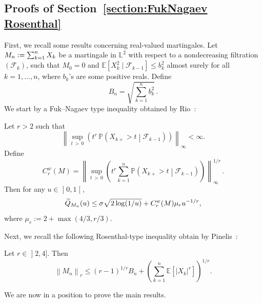 \documentclass[AHL,Unicode,longabstracts,published]{cedram}
\newcommand{\bE}{\mathbb{E}}
\newcommand{\bL}{\mathbb{L}}
\newcommand{\bP}{\mathbb{P}}
\newcommand{\cF}{\mathcal{F}}
\newcommand{\intervalleoo}[2]{\mathopen{]} #1\mathclose{}\mathpunct{},#2\mathclose{[}}
\newcommand{\intervalleof}[2]{\mathopen{]} #1\mathclose{}\mathpunct{},#2\mathclose{]}}
\let\oldtilde\tilde
\renewcommand*{\tilde}[1]{\mathchoice{\widetilde{#1}}{\widetilde{#1}}{\oldtilde{#1}}{\oldtilde{#1}}}
\begin{document}
\subsection{Proofs of Section~\ref{section:FukNagaev Rosenthal}}

First, we recall some results concerning real-valued martingales. Let $M_n:=\sum_{k=1}^n \linebreak X_k$ be a martingale in $\bL^2$ with respect to a nondecreasing filtration $(\cF_k)$, such that $M_0=0$ and $\bE[X_k^2\mid\cF_{k-1}]\leq b_k^2$ almost surely for all $k=1,\ldots,n$, where $b_k$'s are some positive reals. Define
\[
B_n=\sqrt{\sum_{k=1}^n b_k^2}\,.
\]
We start by a Fuk--Nagaev type inequality obtained by Rio~\cite{Rio17a}:
\begin{theo}\label{thm:Fuk-Nagaev Rio}
Let $r>2$ such that
\[
\left\|\sup_{t\,>\,0}\left(t^r\,\bP(X_{k+}>t\middle|\cF_{k-1})\right)\right\|_\infty<\infty.
\]
Define
\[
C_r^w(M)=\left\|\sup_{t\,>\,0}\left(t^r\sum_{k=1}^n\bP\left(X_{k+}>t\middle|\cF_{k-1}\right)\right)\right\|_\infty^{1/r}\,.
\]
Then for any $u\in \intervalleoo 01$,
\begin{equation*}
\tilde{Q}_{M_n}(u)\leq \sigma\sqrt{2\log(1/u)}+C_r^w(M)\mu_r u^{-1/r},
\end{equation*}
where $\mu_r:=2+\max(4/3,r/3)$.
\end{theo}

Next, we recall the following Rosenthal-type inequality obtain by Pinelis~\cite{Pinelis15}:
\begin{theo}\label{thm:Rosenthal Pinelis}
Let $r\in\intervalleof 24$. Then
\[
\left\|M_n\right\|_r\leq (r-1)^{1/r} B_n + \left(\sum_{k=1}^n\bE\left[|X_k|^r\right]\right)^{1/r}.
\]
\end{theo}

We are now in a position to prove the main results.
\end{document}

